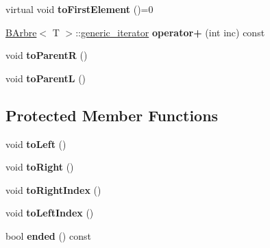 \begin{DoxyCompactItemize}
\item 
\hypertarget{classBArbre_1_1generic__iterator_a20c07b11acf0f1cb3b736b6ff207ed54}{
virtual void {\bfseries toFirstElement} ()=0}
\label{classBArbre_1_1generic__iterator_a20c07b11acf0f1cb3b736b6ff207ed54}

\item 
\hypertarget{classBArbre_1_1generic__iterator_a4d24444d3d847e09d129776a7eb9a613}{
\hyperlink{classBArbre}{BArbre}$<$ T $>$::\hyperlink{classBArbre_1_1generic__iterator}{generic\_\-iterator} {\bfseries operator+} (int inc) const }
\label{classBArbre_1_1generic__iterator_a4d24444d3d847e09d129776a7eb9a613}

\item 
\hypertarget{classBArbre_1_1generic__iterator_a9e25f7baedfc09ccf63704ed80816d27}{
void {\bfseries toParentR} ()}
\label{classBArbre_1_1generic__iterator_a9e25f7baedfc09ccf63704ed80816d27}

\item 
\hypertarget{classBArbre_1_1generic__iterator_ab6514b46fcfc89044f23098b4fc2926b}{
void {\bfseries toParentL} ()}
\label{classBArbre_1_1generic__iterator_ab6514b46fcfc89044f23098b4fc2926b}

\end{DoxyCompactItemize}
\subsection*{Protected Member Functions}
\begin{DoxyCompactItemize}
\item 
\hypertarget{classBArbre_1_1generic__iterator_ac2747857dc30b31b344a57e58c26b38c}{
void {\bfseries toLeft} ()}
\label{classBArbre_1_1generic__iterator_ac2747857dc30b31b344a57e58c26b38c}

\item 
\hypertarget{classBArbre_1_1generic__iterator_a722d723e35a12756bb3307e51286cc7c}{
void {\bfseries toRight} ()}
\label{classBArbre_1_1generic__iterator_a722d723e35a12756bb3307e51286cc7c}

\item 
\hypertarget{classBArbre_1_1generic__iterator_a416a7ba21fe44553da54d4c6f488d663}{
void {\bfseries toRightIndex} ()}
\label{classBArbre_1_1generic__iterator_a416a7ba21fe44553da54d4c6f488d663}

\item 
\hypertarget{classBArbre_1_1generic__iterator_a8d675e482c5a4a178ca2cf0c943e5913}{
void {\bfseries toLeftIndex} ()}
\label{classBArbre_1_1generic__iterator_a8d675e482c5a4a178ca2cf0c943e5913}

\item 
\hypertarget{classBArbre_1_1generic__iterator_a3fe779ec1f1bb330ef26a0e754f774e4}{
bool {\bfseries ended} () const }
\label{classBArbre_1_1generic__iterator_a3fe779ec1f1bb330ef26a0e754f774e4}

\end{DoxyCompactItemize}
